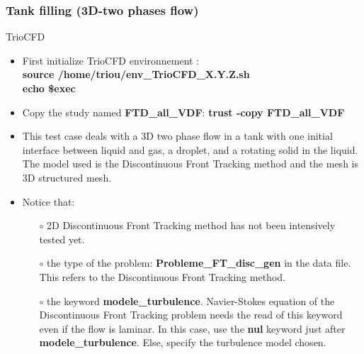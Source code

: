 \documentclass[10pt]{beamer}
\begin{document}
\begin{frame}
\frametitle{Tank filling (3D-two phases flow)}
\begin{block}{TrioCFD}

\begin{itemize}
\item First initialize TrioCFD environnement :\\
\textbf{source /home/triou/env\_TrioCFD\_X.Y.Z.sh }\\
\textbf{echo \$exec} 

\item Copy the study named \textbf{FTD\_all\_VDF}: \textbf{trust -copy FTD\_all\_VDF}

\item This test case deals with a 3D two phase flow in a tank with one initial interface between liquid and gas, a droplet, and a rotating solid in the liquid. The model used is the Discontinuous Front Tracking method and the mesh is 3D structured mesh.

\item Notice that:
    \begin{itemize}
    \item [$\circ$] 2D Discontinuous Front Tracking method has not been intensively tested yet.
    \item [$\circ$] the type of the problem: \textbf{Probleme\_FT\_disc\_gen} in the data file. This refers to the Discontinuous Front Tracking method.
    \item [$\circ$] the keyword \textbf{modele\_turbulence}. Navier-Stokes equation of the Discontinuous Front Tracking problem needs the read of this keyword even if the flow is laminar. In this case, use the \textbf{nul} keyword just after \textbf{modele\_turbulence}. Else, specify the turbulence model chosen.
    \end{itemize}
\end{itemize}

\end{block}
\end{frame}
\end{document}
